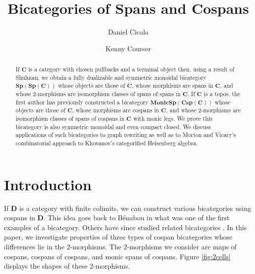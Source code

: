 \documentclass[11pt]{amsart}
\newcommand{\cat}[1]{\mathbf{#1}}
\theoremstyle{remark}
\theoremstyle{definition}
\begin{document}
\sloppy	

\begin{abstract}
If $\cat{C}$ is a category with chosen pullbacks and a terminal object then,
using a result of Shulman, we obtain a fully dualizable and 
symmetric monoidal bicategory $\cat{Sp(Sp(C))}$ 
whose objects are those of $\cat{C}$, 
whose morphisms are spans in $\cat{C}$, 
and whose 2-morphisms are isomorphism classes of spans of spans in $\cat{C}$. 
If $\cat{C}$ is a topos, the first author has previously constructed 
a bicategory $\cat{MonicSp(Csp(C))}$ whose objects are those of $\cat{C}$,
whose morphisms are cospans in $\cat{C}$, 
and whose 2-morphisms are isomorphism classes of spans of cospans in $\cat{C}$ with monic legs. 
We prove this bicategory is also symmetric monoidal and even compact closed.
We discuss applications of such bicategories to graph rewriting as well as 
to Morton and Vicary's combinatorial approach to 
Khovanov's categorified Heisenberg algebra.
\end{abstract}

\title{Bicategories of Spans and Cospans}
\author{Daniel Cicala \and Kenny Courser}
\maketitle

\section{Introduction} 
\label{sec:Introduction}

If $\cat{D}$ is a category with finite colimits, 
we can construct various bicategories using cospans in $\cat{D}$. 
This idea goes back to B\'{e}nabou 
	\cite{Be} 
in what was one of the first examples of a bicategory. 
Others have since studied related bicategories
	\cite{Cour,Reb,Stay}. 
In this paper, we investigate properties of 
three types of cospan bicategories whose differences lie in the 2-morphisms.
The 2-morphisms we consider are 
maps of cospans, cospans of cospans, and monic spans of cospans.  
Figure \ref{fig:2cells} displays the shapes of these 2-morphisms.
\end{document}
